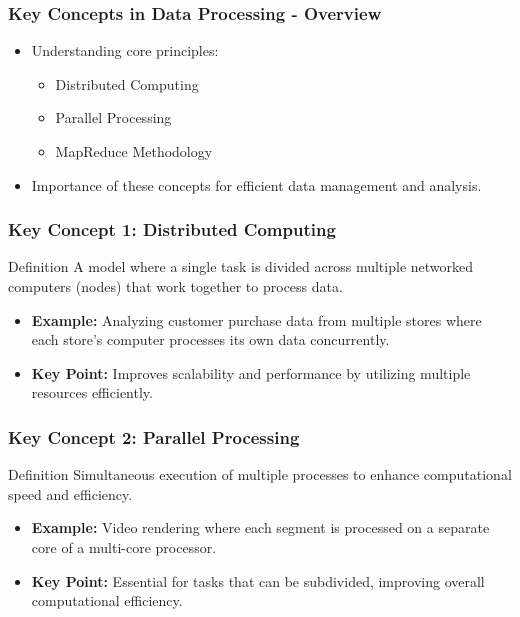 \documentclass[aspectratio=169]{beamer}
\begin{document}
\begin{frame}[fragile]
    \frametitle{Key Concepts in Data Processing - Overview}
    \begin{itemize}
        \item Understanding core principles: 
            \begin{itemize}
                \item Distributed Computing
                \item Parallel Processing
                \item MapReduce Methodology
            \end{itemize}
        \item Importance of these concepts for efficient data management and analysis.
    \end{itemize}
\end{frame}

\begin{frame}[fragile]
    \frametitle{Key Concept 1: Distributed Computing}
    \begin{block}{Definition}
        A model where a single task is divided across multiple networked computers (nodes) that work together to process data.
    \end{block}
    \begin{itemize}
        \item \textbf{Example:} 
            Analyzing customer purchase data from multiple stores where each store’s computer processes its own data concurrently.
        \item \textbf{Key Point:} 
            Improves scalability and performance by utilizing multiple resources efficiently.
    \end{itemize}
\end{frame}

\begin{frame}[fragile]
    \frametitle{Key Concept 2: Parallel Processing}
    \begin{block}{Definition}
        Simultaneous execution of multiple processes to enhance computational speed and efficiency.
    \end{block}
    \begin{itemize}
        \item \textbf{Example:} 
            Video rendering where each segment is processed on a separate core of a multi-core processor.
        \item \textbf{Key Point:} 
            Essential for tasks that can be subdivided, improving overall computational efficiency.
    \end{itemize}
\end{frame}
\end{document}
